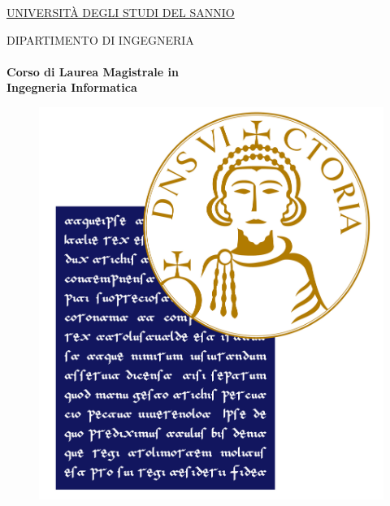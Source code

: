 \linespread{1} %

\thispagestyle{empty}
\large


\begin{center}
	\huge{{\underline{\textsc{UNIVERSIT\`A DEGLI STUDI DEL SANNIO}}}}
\end{center}

\begin{center}   
	\huge{{\textsc{DIPARTIMENTO DI INGEGNERIA}}}
	\\
	\LARGE{\textbf{\\Corso di Laurea Magistrale in \\Ingegneria Informatica}}      
	
\end{center}

\begin{figure}[h]
	\begin{center}
		\includegraphics[scale=0.3]{figure/logo/logoUniSannio_new.jpg}
	\end{center}
\end{figure}


